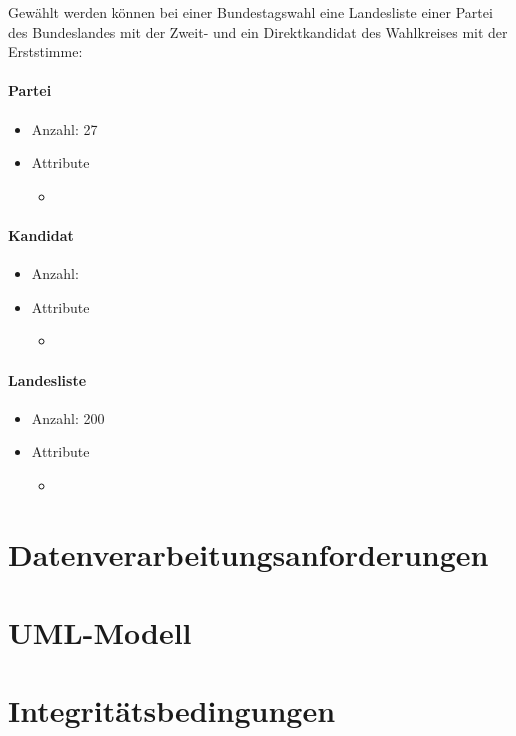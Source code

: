 \documentclass[a4paper]{article}
\begin{document}
Gewählt werden können bei einer Bundestagswahl eine Landesliste einer Partei des Bundeslandes mit der Zweit- und ein Direktkandidat des Wahlkreises mit der Erststimme:

\paragraph{Partei}
\begin{itemize}
\item Anzahl: 27
\item Attribute
	\begin{itemize}
	\item 
	\end{itemize}
\end{itemize}

\paragraph{Kandidat}
\begin{itemize}
\item Anzahl: 
\item Attribute
	\begin{itemize}
	\item 
	\end{itemize}
\end{itemize}

\paragraph{Landesliste}
\begin{itemize}
\item Anzahl: 200
\item Attribute
	\begin{itemize}
	\item 
	\end{itemize}
\end{itemize}



\section{Datenverarbeitungsanforderungen}

\section{UML-Modell}

\section{Integritätsbedingungen}
\end{document}
